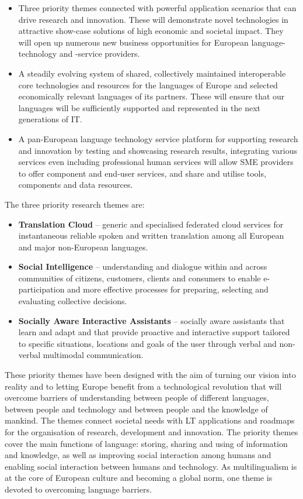 \documentclass[10pt, plain]{../../metanetpaper}
\begin{document}
\begin{multicols}{2}
\begin{itemize}
\item Three priority themes connected with powerful application scenarios that can drive research and innovation. These will demonstrate novel technologies in attractive show-case solutions of high economic and societal impact. They will open up numerous new business opportunities for European language-technology and -service providers.
\item A steadily evolving system of shared, collectively maintained interoperable core technologies and resources for the languages of Europe and selected economically relevant languages of its partners. These will ensure that our languages will be sufficiently supported and represented in the next generations of IT.
\item A pan-European language technology service platform for supporting research and innovation by testing and showcasing research results, integrating various services even including professional human services will allow SME providers to offer component and end-user services, and share and utilise tools, components and data resources. 
\end{itemize}

The three priority research themes are:

\begin{itemize}
\item \textbf{Translation Cloud} -- generic and specialised federated cloud services for instantaneous reliable spoken and written translation among all European and major non-European languages.
\item \textbf{Social Intelligence} -- understanding and dialogue within and across communities of citizens, customers, clients and consumers to enable e-participation and more effective processes for preparing, selecting and evaluating collective decisions.
\item \textbf{Socially Aware Interactive Assistants} -- socially aware assistants that learn and adapt and that provide proactive and interactive support tailored to specific situations, locations and goals of the user through verbal and non-verbal multimodal communication.
\end{itemize}

These priority themes have been designed with the aim of turning our vision into reality and to letting Europe benefit from a technological revolution that will overcome barriers of understanding between people of different languages, between people and technology and between people and the knowledge of mankind. The themes connect societal needs with LT applications and roadmaps for the organisation of research, development and innovation. The priority themes cover the main functions of language: storing, sharing and using of information and knowledge, as well as improving social interaction among humans and enabling social interaction between humans and technology. As multilingualism is at the core of European culture and becoming a global norm, one theme is devoted to overcoming language barriers. 


\end{multicols}
\end{document}
